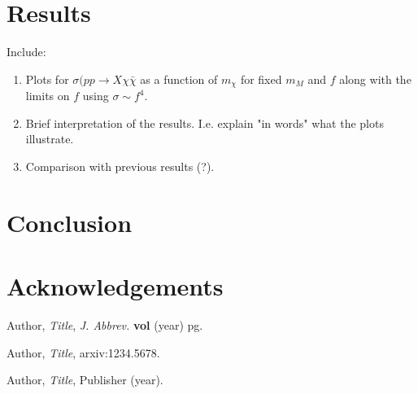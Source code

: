 \documentclass[a4paper,11pt]{article}
\begin{document}
\section{Results} 
\label{sec:sec4}
\begin{flushleft}
Include:
\begin{enumerate}
\item Plots for $\sigma(pp \rightarrow X \chi \bar{\chi}$ as a function of $m_{\chi}$ for fixed $m_{M}$ and $f$ along with the limits on $f$ using $\sigma \sim f^{4}$.
\item Brief interpretation of the results. I.e. explain "in words" what the plots illustrate.
\item Comparison with previous results (?).
\end{enumerate}
\end{flushleft}

\section{Conclusion} 
\label{sec:sec5}

\section{Acknowledgements} 
\label{sec:sec6}

\begin{thebibliography}{99}

Author, \emph{Title}, \emph{J. Abbrev.} {\bf vol} (year) pg.

Author, \emph{Title},
arxiv:1234.5678.

Author, \emph{Title},
Publisher (year).



\end{thebibliography}
\end{document}
